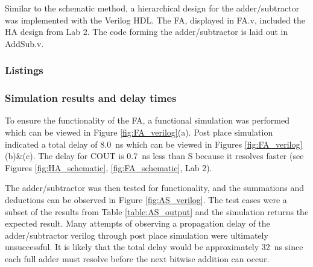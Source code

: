 \documentclass[11pt]{article}
\begin{document}
Similar to the schematic method, a hierarchical design for the adder/subtractor was implemented with the Verilog HDL. The FA, displayed in FA.v, included the HA design from Lab 2. The code forming the adder/subtractor is laid out in AddSub.v.

\subsubsection{Listings}



\subsubsection{Simulation results and delay times}

To ensure the functionality of the FA, a functional simulation was performed which can be viewed in Figure \ref{fig:FA_verilog}(a). Post place simulation indicated a total delay of \SI{8.0}{\nano\second} which can be viewed in Figures \ref{fig:FA_verilog}(b)\&(c). The delay for COUT is \SI{0.7}{\nano\second} less than S because it resolves faster (see Figures \ref{fig:HA_schematic}, \ref{fig:FA_schematic}, Lab 2).

The adder/subtractor was then tested for functionality, and the summations and deductions can be observed in Figure \ref{fig:AS_verilog}. The test cases were a subset of the results from Table \ref{table:AS_output} and the simulation returns the expected result. Many attempts of observing a propagation delay of the adder/subtractor verilog through post place simulation were ultimately unsuccessful. It is likely that the total delay would be approximately \SI{32}{\nano\second} since each full adder must resolve before the next bitwise addition can occur.
\end{document}
